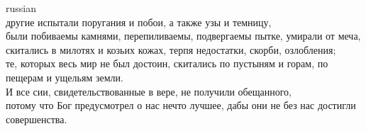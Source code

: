 \documentclass[10pt]{article} %
\begin{document}
{\begin{minipage}[t]{0.45\textwidth}
\begin{otherlanguage*}{russian}
\\
другие испытали поругания и побои, а также узы и темницу,
\\
были побиваемы камнями, перепиливаемы, подвергаемы пытке, умирали от меча, скитались в милотях и козьих кожах, терпя недостатки, скорби, озлобления;
\\
те, которых весь мир не был достоин, скитались по пустыням и горам, по пещерам и ущельям земли.
\\
И все сии, свидетельствованные в вере, не получили обещанного,
\\
потому что Бог предусмотрел о нас нечто лучшее, дабы они не без нас достигли совершенства.
\end{otherlanguage*}
\end{minipage}
\hfill
\begin{minipage}[t]{0.45\textwidth}


\end{minipage}}
\end{document}
